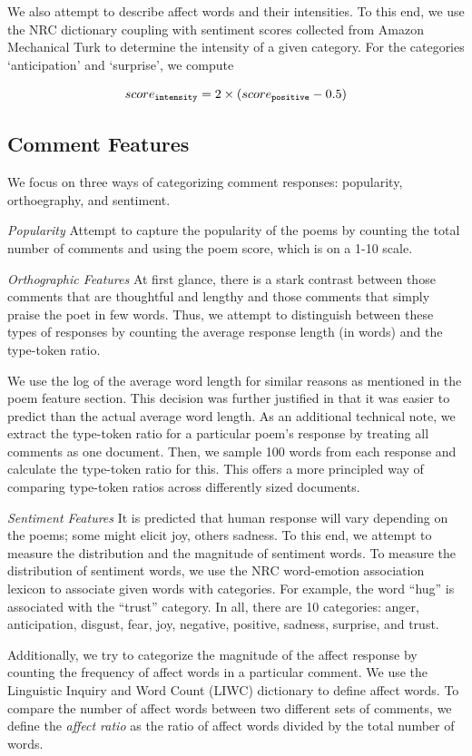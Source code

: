 \documentclass[11pt]{article}
\begin{document}
We also attempt to describe affect words and their intensities. To this end, we use the NRC dictionary coupling with sentiment scores collected from Amazon Mechanical Turk to determine the intensity of a given category. For the categories `anticipation’ and `surprise’, we compute 

$$score_{\tt intensity} = 2 \times ( score_{\tt positive} - 0.5 )$$

\subsection*{Comment Features}
We focus on three ways of categorizing comment responses: popularity, orthoegraphy, and sentiment.

\emph{Popularity}
Attempt to capture the popularity of the poems by counting the total number of comments and using the poem score, which is on a 1-10 scale.

\emph{Orthographic Features}
At first glance, there is a stark contrast between those comments that are thoughtful and lengthy and those comments that simply praise the poet in few words. Thus, we attempt to distinguish between these types of responses by counting the average response length (in words) and the type-token ratio. 

We use the log of the average word length for similar reasons as mentioned in the poem feature section. This decision was further justified in that it was easier to predict than the actual average word length. As an additional technical note, we extract the type-token ratio for a particular poem's response by treating all comments as one document. Then, we sample 100 words from each response and calculate the type-token ratio for this. This offers a more principled way of comparing type-token ratios across differently sized documents.

\emph{Sentiment Features}
It is predicted that human response will vary depending on the poems; some might elicit joy, others sadness. To this end, we attempt to measure the distribution and the magnitude of sentiment words. To measure the distribution of sentiment words, we use the NRC word-emotion association lexicon \cite{mohammad2010emotions} to associate given words with categories. For example, the word ``hug'' is associated with the ``trust'' category. In all, there are 10 categories: anger, anticipation, disgust, fear, joy, negative, positive, sadness, surprise, and trust.

Additionally, we try to categorize the magnitude of the affect response by counting the frequency of affect words in a particular comment. We use the Linguistic Inquiry and Word Count (LIWC) dictionary\cite{pennebaker2001linguistic} to define affect words. To compare the number of affect words between two different sets of comments, we define the \emph{affect ratio} as the ratio of affect words divided by the total number of words.
\end{document}
